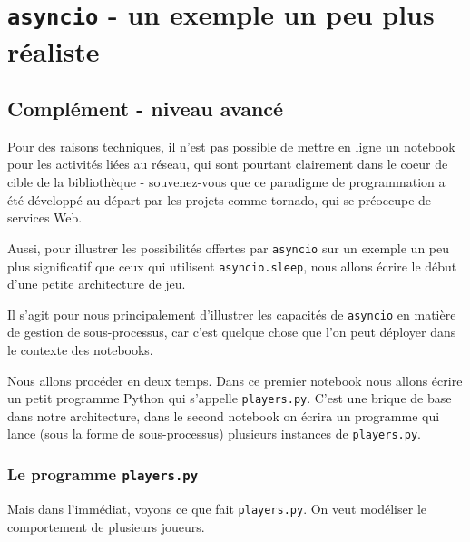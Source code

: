     
    
    
    

    

    \hypertarget{asyncio---un-exemple-un-peu-plus-ruxe9aliste}{%
\section{\texorpdfstring{\texttt{asyncio} - un exemple un peu plus
réaliste}{asyncio - un exemple un peu plus réaliste}}\label{asyncio---un-exemple-un-peu-plus-ruxe9aliste}}

    \hypertarget{compluxe9ment---niveau-avancuxe9}{%
\subsection{Complément - niveau
avancé}\label{compluxe9ment---niveau-avancuxe9}}

    Pour des raisons techniques, il n'est pas possible de mettre en ligne un
notebook pour les activités liées au réseau, qui sont pourtant
clairement dans le coeur de cible de la bibliothèque - souvenez-vous que
ce paradigme de programmation a été développé au départ par les projets
comme tornado, qui se préoccupe de services Web.

    Aussi, pour illustrer les possibilités offertes par \texttt{asyncio} sur
un exemple un peu plus significatif que ceux qui utilisent
\texttt{asyncio.sleep}, nous allons écrire le début d'une petite
architecture de jeu.

Il s'agit pour nous principalement d'illustrer les capacités de
\texttt{asyncio} en matière de gestion de sous-processus, car c'est
quelque chose que l'on peut déployer dans le contexte des notebooks.

    Nous allons procéder en deux temps. Dans ce premier notebook nous allons
écrire un petit programme Python qui s'appelle \texttt{players.py}.
C'est une brique de base dans notre architecture, dans le second
notebook on écrira un programme qui lance (sous la forme de
sous-processus) plusieurs instances de \texttt{players.py}.

    \hypertarget{le-programme-players.py}{%
\subsubsection{\texorpdfstring{Le programme
\texttt{players.py}}{Le programme players.py}}\label{le-programme-players.py}}

    Mais dans l'immédiat, voyons ce que fait \texttt{players.py}. On veut
modéliser le comportement de plusieurs joueurs.

